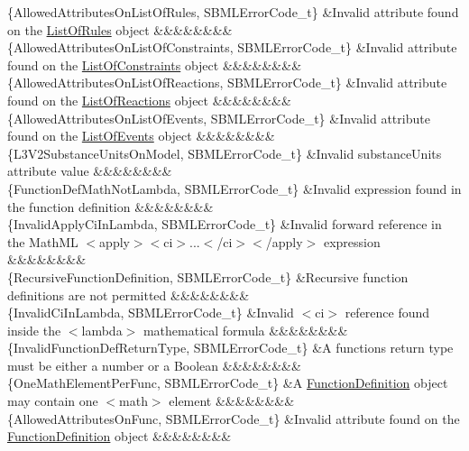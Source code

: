 \begin{DoxyParagraph}{}
\begin{longtabu}
\{Allowed\+Attributes\+On\+List\+Of\+Rules, S\+B\+M\+L\+Error\+Code\+\_\+t\} &Invalid attribute found on the \hyperlink{class_list_of_rules}{List\+Of\+Rules} object &&&&&&&&\\
\{Allowed\+Attributes\+On\+List\+Of\+Constraints, S\+B\+M\+L\+Error\+Code\+\_\+t\} &Invalid attribute found on the \hyperlink{class_list_of_constraints}{List\+Of\+Constraints} object &&&&&&&&\\
\{Allowed\+Attributes\+On\+List\+Of\+Reactions, S\+B\+M\+L\+Error\+Code\+\_\+t\} &Invalid attribute found on the \hyperlink{class_list_of_reactions}{List\+Of\+Reactions} object &&&&&&&&\\
\{Allowed\+Attributes\+On\+List\+Of\+Events, S\+B\+M\+L\+Error\+Code\+\_\+t\} &Invalid attribute found on the \hyperlink{class_list_of_events}{List\+Of\+Events} object &&&&&&&&\\
\{L3\+V2\+Substance\+Units\+On\+Model, S\+B\+M\+L\+Error\+Code\+\_\+t\} &Invalid \textquotesingle{}substance\+Units\textquotesingle{} attribute value &&&&&&&&\\
\{Function\+Def\+Math\+Not\+Lambda, S\+B\+M\+L\+Error\+Code\+\_\+t\} &Invalid expression found in the function definition &&&&&&&&\\
\{Invalid\+Apply\+Ci\+In\+Lambda, S\+B\+M\+L\+Error\+Code\+\_\+t\} &Invalid forward reference in the Math\+ML {\ttfamily $<$apply$>$}{\ttfamily $<$ci$>$}...{\ttfamily $<$/ci$>$}{\ttfamily $<$/apply$>$} expression &&&&&&&&\\
\{Recursive\+Function\+Definition, S\+B\+M\+L\+Error\+Code\+\_\+t\} &Recursive function definitions are not permitted &&&&&&&&\\
\{Invalid\+Ci\+In\+Lambda, S\+B\+M\+L\+Error\+Code\+\_\+t\} &Invalid {\ttfamily $<$ci$>$} reference found inside the {\ttfamily $<$lambda$>$} mathematical formula &&&&&&&&\\
\{Invalid\+Function\+Def\+Return\+Type, S\+B\+M\+L\+Error\+Code\+\_\+t\} &A function\textquotesingle{}s return type must be either a number or a Boolean &&&&&&&&\\
\{One\+Math\+Element\+Per\+Func, S\+B\+M\+L\+Error\+Code\+\_\+t\} &A \hyperlink{class_function_definition}{Function\+Definition} object may contain one {\ttfamily $<$math$>$} element &&&&&&&&\\
\{Allowed\+Attributes\+On\+Func, S\+B\+M\+L\+Error\+Code\+\_\+t\} &Invalid attribute found on the \hyperlink{class_function_definition}{Function\+Definition} object &&&&&&&&\\

\end{longtabu}
\end{DoxyParagraph}
